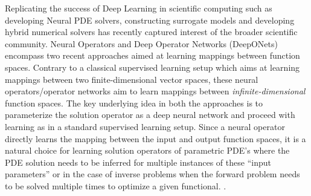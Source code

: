 Replicating the success of Deep Learning in scientific computing such as developing Neural PDE solvers, constructing surrogate models and developing hybrid numerical solvers has recently captured interest of the broader scientific community. Neural Operators \citet{li_fourier_2021,li_markov_2021} and Deep Operator Networks (DeepONets) \citet{lu20201DeepONet,wang_learning_2021} encompass two recent approaches aimed at learning mappings between function spaces. Contrary to a classical supervised learning setup which aims at learning mappings between two finite-dimensional vector spaces, these neural operators/operator networks aim to learn mappings between \emph{infinite-dimensional} function spaces. 
The key underlying idea in both the approaches is to parameterize the solution operator as a deep neural network and proceed with learning as in a standard supervised learning setup. 
Since a neural operator directly learns the mapping between the input and output function spaces, it is a natural choice for learning solution operators of parametric PDE's where the PDE solution needs to be inferred for multiple instances of these ``input parameters'' or in the case of inverse problems when the forward problem needs to be solved multiple times to optimize a given functional. . 

